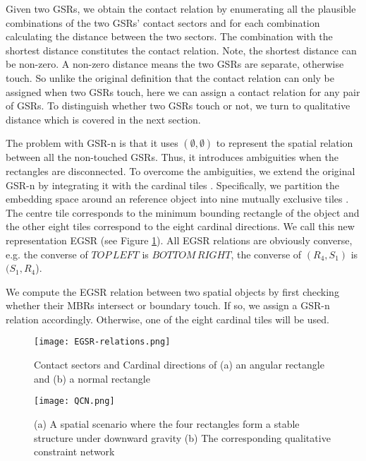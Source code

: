 \documentclass[letterpaper]{article}
\begin{document}
Given two GSRs, we obtain the contact relation by enumerating all the plausible combinations of the two GSRs' contact sectors and for each combination calculating the distance between the two sectors. The combination with the shortest distance constitutes the contact relation. Note, the shortest distance can be non-zero. A non-zero distance means the two GSRs are separate, otherwise touch. So unlike the original definition that the contact relation can only be assigned when two GSRs touch, here we can assign a contact relation for any pair of GSRs. To distinguish whether two GSRs touch or not, we turn to qualitative distance which is covered in the next section.

The problem with GSR-n is that it uses $(\emptyset, \emptyset)$ to represent the spatial relation between all the non-touched GSRs. Thus, it introduces ambiguities when the rectangles are disconnected. To overcome the ambiguities, we extend the original GSR-n by integrating it with the cardinal tiles \cite{goyal1997direction}. Specifically, we partition the embedding space around an reference object into nine mutually exclusive tiles . The centre tile corresponds to the minimum bounding rectangle of the object and the other eight tiles correspond to the eight cardinal directions. We call this new representation EGSR (see Figure \ref{EGSR}). All EGSR relations are obviously converse, e.g. the converse of $TOP\,LEFT$ is $BOTTOM\,RIGHT$, the converse of $(R_4, S_1)$ is $(S_1,R_4$).

We compute the EGSR relation between two spatial objects by first checking whether their MBRs intersect or boundary touch. If so, we assign a GSR-n relation accordingly. Otherwise, one of the eight cardinal tiles will be used. 

\begin{figure}[h!]
\centering\texttt{[image: EGSR-relations.png]}\caption{Contact sectors and Cardinal directions of (a) an angular rectangle and (b) a normal rectangle}
\label{EGSR}
\end{figure}

 \begin{figure}[h!]
\centering\texttt{[image: QCN.png]}\caption{(a) A spatial scenario where the four rectangles form a stable structure under downward gravity (b) The corresponding qualitative constraint network}
\label{QCN}
\end{figure}
\end{document}
